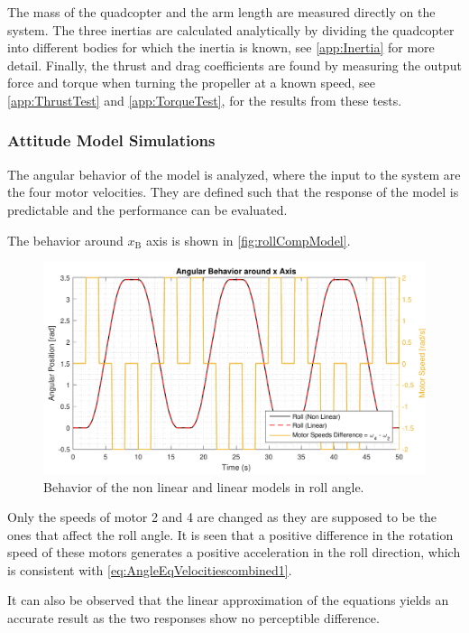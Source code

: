 The mass of the quadcopter and the arm length are measured directly on the system. The three inertias are calculated analytically by dividing the quadcopter into different bodies for which the inertia is known, see \autoref{app:Inertia} for more detail. Finally, the thrust and drag coefficients are found by measuring the output force and torque when turning the propeller at a known speed, see \autoref{app:ThrustTest} and \ref{app:TorqueTest}, for the results from these tests.

\subsubsection{Attitude Model Simulations}
The angular behavior of the model is analyzed, where the input to the system are the four motor velocities. They are defined such that the response of the model is predictable and the performance can be evaluated.

The behavior around $x_{\mathrm{B}}$ axis is shown in \autoref{fig:rollCompModel}. 
%
\begin{figure}[H]
	\centering
	\includegraphics[scale=0.65]{figures/rollCompModel}
	\caption{Behavior of the non linear and linear models in roll angle.}
	\label{fig:rollCompModel}
\end{figure}
%
Only the speeds of motor 2 and 4 are changed as they are supposed to be the ones that affect the roll angle. It is seen that a positive difference in the rotation speed of these motors generates a positive acceleration in the roll direction, which is consistent with \autoref{eq:AngleEqVelocitiescombined1}.

It can also be observed that the linear approximation of the equations yields an accurate result as the two responses show no perceptible difference.\\ \\


